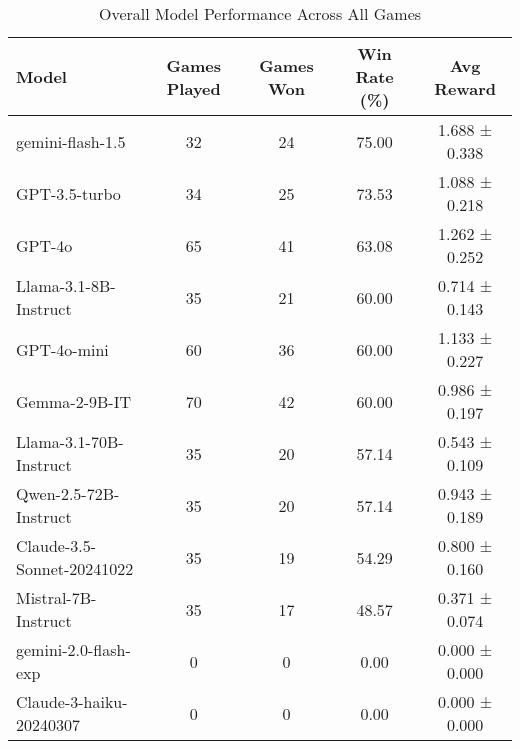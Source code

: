 \begin{table}[htbp]
\centering
\caption{Overall Model Performance Across All Games}
\begin{tabular}{lcccc}
\toprule
Model & Games Played & Games Won & Win Rate (\%) & Avg Reward \\
\midrule
gemini-flash-1.5 & 32 & 24 & 75.00 & 1.688 ± 0.338 \\
GPT-3.5-turbo & 34 & 25 & 73.53 & 1.088 ± 0.218 \\
GPT-4o & 65 & 41 & 63.08 & 1.262 ± 0.252 \\
Llama-3.1-8B-Instruct & 35 & 21 & 60.00 & 0.714 ± 0.143 \\
GPT-4o-mini & 60 & 36 & 60.00 & 1.133 ± 0.227 \\
Gemma-2-9B-IT & 70 & 42 & 60.00 & 0.986 ± 0.197 \\
Llama-3.1-70B-Instruct & 35 & 20 & 57.14 & 0.543 ± 0.109 \\
Qwen-2.5-72B-Instruct & 35 & 20 & 57.14 & 0.943 ± 0.189 \\
Claude-3.5-Sonnet-20241022 & 35 & 19 & 54.29 & 0.800 ± 0.160 \\
Mistral-7B-Instruct & 35 & 17 & 48.57 & 0.371 ± 0.074 \\
gemini-2.0-flash-exp & 0 & 0 & 0.00 & 0.000 ± 0.000 \\
Claude-3-haiku-20240307 & 0 & 0 & 0.00 & 0.000 ± 0.000 \\
\bottomrule
\end{tabular}
\end{table}

